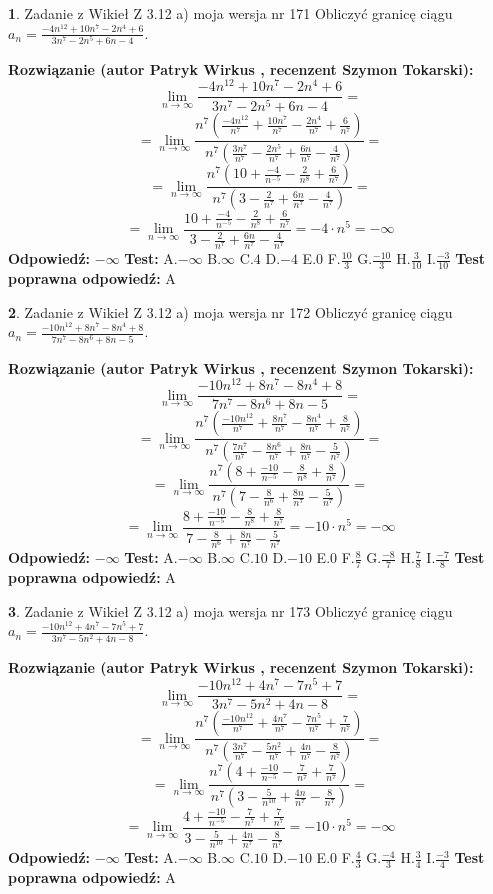 \documentclass[12pt, a4paper]{article}
\theoremstyle{definition} %
\newtheorem{zad}{}
\newcommand{\zadStart}[1]{\begin{zad}#1\newline}
\newcommand{\zadStop}{\end{zad}}
\newcommand{\rozwStart}[2]{\noindent \textbf{Rozwiązanie (autor #1 , recenzent #2): }\newline}
\newcommand{\rozwStop}{\newline}
\newcommand{\odpStart}{\noindent \textbf{Odpowiedź:}\newline}
\newcommand{\odpStop}{\newline}
\newcommand{\testStart}{\noindent \textbf{Test:}\newline}
\newcommand{\testStop}{\newline}
\newcommand{\kluczStart}{\noindent \textbf{Test poprawna odpowiedź:}\newline}
\newcommand{\kluczStop}{\newline}
\begin{document}
\zadStart{Zadanie z Wikieł Z 3.12 a) moja wersja nr 171}
Obliczyć granicę ciągu $a_{n}=\frac{-4n^{12}+10n^{7}-2n^{4}+6}{3n^{7}-2n^{5}+6n-4}$.
\zadStop
\rozwStart{Patryk Wirkus}{Szymon Tokarski}
$$\lim\limits_{n\to\infty}\frac{-4n^{12}+10n^{7}-2n^{4}+6}{3n^{7}-2n^{5}+6n-4}=$$
$$=\lim\limits_{n\to\infty}\frac{n^{7}\left(\frac{-4n^{12}}{n^{7}}+\frac{10n^{7}}{n^{7}}-\frac{2n^{4}}{n^{7}}+\frac{6}{n^{7}}\right)}{n^{7}\left(\frac{3n^{7}}{n^{7}}-\frac{2n^{5}}{n^{7}}+\frac{6n}{n^{7}}-\frac{4}{n^{7}}\right)}=$$
$$=\lim\limits_{n\to\infty}\frac{n^{7}\left(10+\frac{-4}{n^{-5}}-\frac{2}{n^{8}}+\frac{6}{n^{7}}\right)}
{n^{7}\left(3-\frac{2}{n^{7}}+\frac{6n}{n^{7}}-\frac{4}{n^{7}}\right)}=$$
$$=\lim\limits_{n\to\infty}\frac{10+\frac{-4}{n^{-5}}-\frac{2}{n^{8}}+\frac{6}{n^{7}}}{3-\frac{2}{n^{7}}+\frac{6n}{n^{7}}-\frac{4}{n^{7}}}=-4\cdot n^{5} = -\infty$$
\rozwStop
\odpStart
$-\infty$
\odpStop
\testStart
A.$-\infty$
B.$\infty$
C.$4$
D.$-4$
E.$0$
F.$\frac{10}{3}$
G.$\frac{-10}{3}$
H.$\frac{3}{10}$
I.$\frac{-3}{10}$
\testStop
\kluczStart
A
\kluczStop



\zadStart{Zadanie z Wikieł Z 3.12 a) moja wersja nr 172}
Obliczyć granicę ciągu $a_{n}=\frac{-10n^{12}+8n^{7}-8n^{4}+8}{7n^{7}-8n^{6}+8n-5}$.
\zadStop
\rozwStart{Patryk Wirkus}{Szymon Tokarski}
$$\lim\limits_{n\to\infty}\frac{-10n^{12}+8n^{7}-8n^{4}+8}{7n^{7}-8n^{6}+8n-5}=$$
$$=\lim\limits_{n\to\infty}\frac{n^{7}\left(\frac{-10n^{12}}{n^{7}}+\frac{8n^{7}}{n^{7}}-\frac{8n^{4}}{n^{7}}+\frac{8}{n^{7}}\right)}{n^{7}\left(\frac{7n^{7}}{n^{7}}-\frac{8n^{6}}{n^{7}}+\frac{8n}{n^{7}}-\frac{5}{n^{7}}\right)}=$$
$$=\lim\limits_{n\to\infty}\frac{n^{7}\left(8+\frac{-10}{n^{-5}}-\frac{8}{n^{8}}+\frac{8}{n^{7}}\right)}
{n^{7}\left(7-\frac{8}{n^{6}}+\frac{8n}{n^{7}}-\frac{5}{n^{7}}\right)}=$$
$$=\lim\limits_{n\to\infty}\frac{8+\frac{-10}{n^{-5}}-\frac{8}{n^{8}}+\frac{8}{n^{7}}}{7-\frac{8}{n^{6}}+\frac{8n}{n^{7}}-\frac{5}{n^{7}}}=-10\cdot n^{5} = -\infty$$
\rozwStop
\odpStart
$-\infty$
\odpStop
\testStart
A.$-\infty$
B.$\infty$
C.$10$
D.$-10$
E.$0$
F.$\frac{8}{7}$
G.$\frac{-8}{7}$
H.$\frac{7}{8}$
I.$\frac{-7}{8}$
\testStop
\kluczStart
A
\kluczStop



\zadStart{Zadanie z Wikieł Z 3.12 a) moja wersja nr 173}
Obliczyć granicę ciągu $a_{n}=\frac{-10n^{12}+4n^{7}-7n^{5}+7}{3n^{7}-5n^{2}+4n-8}$.
\zadStop
\rozwStart{Patryk Wirkus}{Szymon Tokarski}
$$\lim\limits_{n\to\infty}\frac{-10n^{12}+4n^{7}-7n^{5}+7}{3n^{7}-5n^{2}+4n-8}=$$
$$=\lim\limits_{n\to\infty}\frac{n^{7}\left(\frac{-10n^{12}}{n^{7}}+\frac{4n^{7}}{n^{7}}-\frac{7n^{5}}{n^{7}}+\frac{7}{n^{7}}\right)}{n^{7}\left(\frac{3n^{7}}{n^{7}}-\frac{5n^{2}}{n^{7}}+\frac{4n}{n^{7}}-\frac{8}{n^{7}}\right)}=$$
$$=\lim\limits_{n\to\infty}\frac{n^{7}\left(4+\frac{-10}{n^{-5}}-\frac{7}{n^{7}}+\frac{7}{n^{7}}\right)}
{n^{7}\left(3-\frac{5}{n^{10}}+\frac{4n}{n^{7}}-\frac{8}{n^{7}}\right)}=$$
$$=\lim\limits_{n\to\infty}\frac{4+\frac{-10}{n^{-5}}-\frac{7}{n^{7}}+\frac{7}{n^{7}}}{3-\frac{5}{n^{10}}+\frac{4n}{n^{7}}-\frac{8}{n^{7}}}=-10\cdot n^{5} = -\infty$$
\rozwStop
\odpStart
$-\infty$
\odpStop
\testStart
A.$-\infty$
B.$\infty$
C.$10$
D.$-10$
E.$0$
F.$\frac{4}{3}$
G.$\frac{-4}{3}$
H.$\frac{3}{4}$
I.$\frac{-3}{4}$
\testStop
\kluczStart
A
\kluczStop
\end{document}
